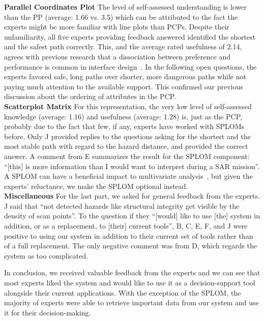 \documentclass{egpubl}
\begin{document}
\textbf{Parallel Coordinates Plot} The level of self-assessed understanding is lower than the PP (average: 1.66 vs. 3.5) which can be attributed to the fact the experts might be more familiar with line plots than PCPs. Despite their unfamiliarity, all five experts providing feedback answered identified the shortest and the safest path correctly. This, and the average rated usefulness of 2.14,  agrees with previous research that a dissociation between preference and performance is common in interface design~\cite{andre1995users}. In the following open questions, the experts favored safe, long paths over shorter, more dangerous paths while not paying much attention to the available support. This confirmed our previous discussion about the ordering of attributes in the PCP.\\
\textbf{Scatterplot Matrix} For this representation, the very low level of self-assessed knowledge (average: 1.16) and usefulness (average: 1.28) is, just as the PCP, probably due to the fact that few, if any, experts have worked with SPLOMs before. Only J provided replies to the questions asking for the shortest and the most stable path with regard to the hazard distance, and provided the correct answer. A comment from E summarizes the result for the SPLOM component: ``[this] is more information than I would want to interpret during a SAR mission''. A SPLOM can have a beneficial impact to multivariate analysis~\cite{6064985}, but given the experts' reluctance, we make the SPLOM optional instead.\\
\textbf{Miscellaneous} For the last part, we asked for general feedback from the experts. J said that ``not detected hazards like structural integrity get visible by the density of scan points''. To the question if they ``[would] like to use [the] system in addition, or as a replacement, to [their] current tools'', B, C, E, F, and J were positive to using our system in addition to their current set of tools rather than of a full replacement. The only negative comment was from D, which regards the system as too complicated. 

In conclusion, we received valuable feedback from the experts and we can see that most experts liked the system and would like to use it as a decision-support tool alongside their current applications. With the exception of the SPLOM, the majority of experts were able to retrieve important data from our system and use it for their decision-making.

\end{document}
